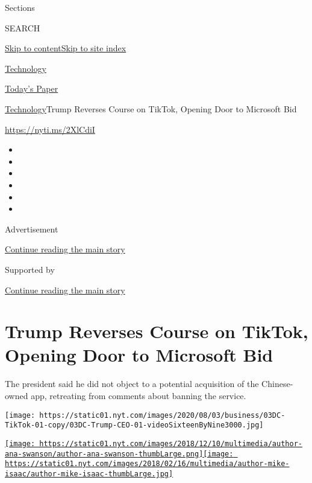Sections

SEARCH

\protect\hyperlink{site-content}{Skip to
content}\protect\hyperlink{site-index}{Skip to site index}

\href{https://www.nytimes.com/section/technology}{Technology}

\href{https://myaccount.nytimes.com/auth/login?response_type=cookie\&client_id=vi}{}

\href{https://www.nytimes.com/section/todayspaper}{Today's Paper}

\href{/section/technology}{Technology}\textbar{}Trump Reverses Course on
TikTok, Opening Door to Microsoft Bid

\url{https://nyti.ms/2XlCdiI}

\begin{itemize}
\item
\item
\item
\item
\item
\item
\end{itemize}

Advertisement

\protect\hyperlink{after-top}{Continue reading the main story}

Supported by

\protect\hyperlink{after-sponsor}{Continue reading the main story}

\hypertarget{trump-reverses-course-on-tiktok-opening-door-to-microsoft-bid}{%
\section{Trump Reverses Course on TikTok, Opening Door to Microsoft
Bid}\label{trump-reverses-course-on-tiktok-opening-door-to-microsoft-bid}}

The president said he did not object to a potential acquisition of the
Chinese-owned app, retreating from comments about banning the service.

\texttt{[image: https://static01.nyt.com/images/2020/08/03/business/03DC-TikTok-01-copy/03DC-Trump-CEO-01-videoSixteenByNine3000.jpg]}

\href{https://www.nytimes.com/by/ana-swanson}{\texttt{[image: https://static01.nyt.com/images/2018/12/10/multimedia/author-ana-swanson/author-ana-swanson-thumbLarge.png]}}\href{https://www.nytimes.com/by/mike-isaac}{\texttt{[image: https://static01.nyt.com/images/2018/02/16/multimedia/author-mike-isaac/author-mike-isaac-thumbLarge.jpg]}}

